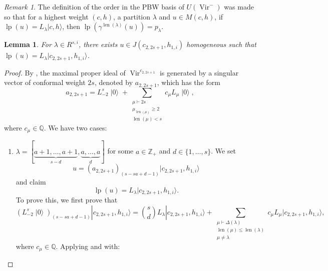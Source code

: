 \documentclass[a4paper, 12pt, reqno]{amsart}
\newtheorem{lemma}[theorem]{Lemma}
\theoremstyle{remark}
\newtheorem{remark}[theorem]{Remark}
\DeclareMathOperator{\Vir}{Vir}
\DeclareMathOperator{\len}{len}
\DeclareMathOperator{\vac}{|0\rangle}
\DeclareMathOperator{\lp}{lp}
\begin{document}
\begin{remark}
  \label{rmk:4}
  The definition of the order in the PBW basis of $U(\Vir^-)$ was made so that for a highest weight $(c, h)$, a partition $\lambda$ and $u \in M(c, h)$, if $\lp(u) = L_{\lambda}|c, h\rangle$, then $\lp(\gamma^{\len(\lambda)}(u)) = p_{\lambda}$.
\end{remark}

\begin{lemma}
  \label{lmm:10}
  For $\lambda \in R^{s, i}$, there exists $u \in J(c_{2, 2s + 1}, h_{1, i})$ homogeneous such that $\lp(u) = L_{\lambda}|c_{2, 2s + 1}, h_{1, i}\rangle$.
\end{lemma}

\begin{proof}
  By , the maximal proper ideal of $\Vir^{c_{2, 2s + 1}}$ is generated by a singular vector of conformal weight $2s$, denoted by $a_{2, 2s + 1}$, which has the form
  \begin{equation}
    \label{eq:4}
    a_{2, 2s + 1} = L_{-2}^s\vac + \sum_{\substack{\mu \vdash 2s \\ \mu_{\len(\mu)} \ge 2 \\ \len(\mu) < s}}c_{\mu}L_{\mu}\vac,
  \end{equation}
  where $c_{\mu} \in \mathbb{Q}$.
  We have two cases:
  \begin{enumerate}
  \item $\lambda = [\underbrace{a + 1, \dots, a + 1}_{s - d}, \underbrace{a, \dots, a}_d]$ for some $a \in \mathbb{Z}_+$ and $d \in \{1, \dots, s\}$.
    We set
    \begin{equation*}
      u = (a_{2, 2s + 1})_{(s - sa + d - 1)}|c_{2, 2s + 1}, h_{1, i}\rangle
    \end{equation*}
    and claim
    \begin{equation*}
      \lp(u) = L_{\lambda}|c_{2, 2s + 1}, h_{1, i}\rangle.
    \end{equation*}
    To prove this, we first prove that
    \begin{equation}
      \label{eq:5}
      (L_{-2}^s\vac)_{(s - sa + d - 1)}|c_{2, 2s + 1}, h_{1, i}\rangle = \binom{s}{d}L_{\lambda}|c_{2, 2s + 1}, h_{1, i}\rangle + \sum_{\substack{\mu \vdash \Delta(\lambda) \\ \len(\mu) \le \len(\lambda) \\ \mu \neq \lambda}}c_{\mu}L_{\mu}|c_{2, 2s + 1}, h_{1, i}\rangle,
    \end{equation}
    where $c_{\mu} \in \mathbb{Q}$.
    Applying  and  with:

\end{enumerate}
\end{proof}
\end{document}

